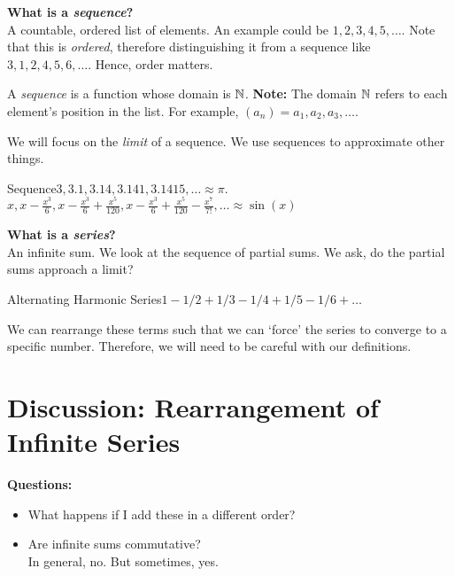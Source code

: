 \textbf{What is a \textit{sequence}?} \\

A countable, ordered list of elements. An example could be $1,2,3,4,5,\dots$. Note that this is \textit{ordered}, therefore distinguishing it from a sequence like $3,1,2,4,5,6,\dots$. Hence, order matters.

A \textit{sequence} is a function whose domain is $\mathbb{N}$. \textbf{Note:} The domain $\mathbb{N}$ refers to each element's position in the list. For example, $(a_n) = a_1,a_2,a_3,\dots$.

We will focus on the \textit{limit} of a sequence. We use sequences to approximate other things. 

\begin{example}
    {Sequence}$3,3.1,3.14,3.141,3.1415,\dots \approx \pi$. \\
    $x, x - \frac{x^3}{6}, x - \frac{x^3}{6} + \frac{x^5}{120}, x - \frac{x^3}{6} + \frac{x^5}{120} - \frac{x^7}{7!}, \dots \approx \sin(x)$
\end{example}

\noindent\textbf{What is a \textit{series}?} \\

An infinite sum. We look at the sequence of partial sums. We ask, do the partial sums approach a limit?

\begin{example}
    {Alternating Harmonic Series}$1 - 1/2 + 1/3 - 1/4 + 1/5 - 1/6 + \dots$
\end{example}

We can rearrange these terms such that we can `force' the series to converge to a specific number. Therefore, we will need to be careful with our definitions. 

\section{Discussion: Rearrangement of Infinite Series}

\noindent \textbf{Questions:}

\begin{itemize}
    \item What happens if I add these in a different order?
    \item Are infinite sums commutative? \\
    In general, no. But sometimes, yes. 
\end{itemize}

